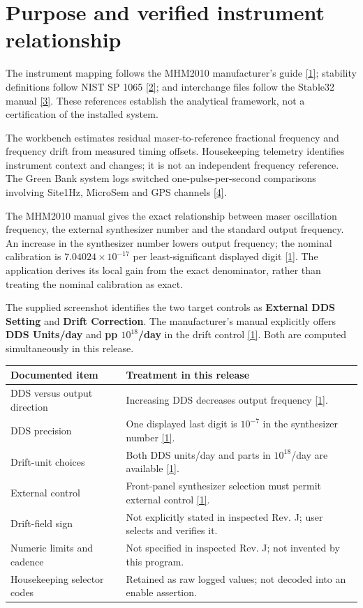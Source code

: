 \documentclass[11pt,a4paper]{article}
\newcommand{\manual}{\href{https://www.gb.nrao.edu/~fghigo/timer/MSMmaser/Maser_UG_75666-201_Rev_J.PDF}{[1]}}
\newcommand{\nist}{\href{https://tf.nist.gov/general/pdf/2220.pdf}{[2]}}
\newcommand{\stablemanual}{\href{http://www.stable32.com/Manual154.pdf}{[3]}}
\newcommand{\siteclock}{\href{https://www.gb.nrao.edu/~fghigo/timer/time_logging.html}{[4]}}
\begin{document}
\section{Purpose and verified instrument relationship}
The instrument mapping follows the MHM2010 manufacturer's guide \manual;
stability definitions follow NIST SP 1065 \nist; and interchange files follow
the Stable32 manual \stablemanual. These references establish the analytical
framework, not a certification of the installed system.

The workbench estimates residual maser-to-reference fractional frequency and
frequency drift from measured timing offsets. Housekeeping telemetry identifies
instrument context and changes; it is not an independent frequency reference.
The Green Bank system logs switched one-pulse-per-second comparisons involving
Site1Hz, MicroSem and GPS channels \siteclock.

The MHM2010 manual gives the exact relationship between maser oscillation
frequency, the external synthesizer number and the standard output frequency.
An increase in the synthesizer number lowers output frequency; the nominal
calibration is \(7.04024\times10^{-17}\) per least-significant displayed digit
\manual. The application derives its local gain from the exact denominator,
rather than treating the nominal calibration as exact.

The supplied screenshot identifies the two target controls as \textbf{External
DDS Setting} and \textbf{Drift Correction}. The manufacturer's manual explicitly
offers \textbf{DDS Units/day} and \textbf{pp \(10^{18}\)/day} in the drift control
\manual. Both are computed simultaneously in this release.

\begin{longtable}{@{}p{.31\linewidth}p{.64\linewidth}@{}}
\toprule
Documented item & Treatment in this release\\
\midrule
DDS versus output direction & Increasing DDS decreases output frequency \manual.\\
DDS precision & One displayed last digit is \(10^{-7}\) in the synthesizer number \manual.\\
Drift-unit choices & Both DDS units/day and parts in \(10^{18}\)/day are available \manual.\\
External control & Front-panel synthesizer selection must permit external control \manual.\\
Drift-field sign & Not explicitly stated in inspected Rev. J; user selects and verifies it.\\
Numeric limits and cadence & Not specified in inspected Rev. J; not invented by this program.\\
Housekeeping selector codes & Retained as raw logged values; not decoded into an enable assertion.\\
\bottomrule
\end{longtable}
\end{document}
